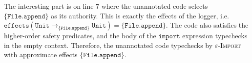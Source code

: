 \documentclass[sigplan,10pt,review]{acmart}\settopmatter{printfolios=true,printccs=false,printacmref=false}
\newcommand{\Unit}{\kwa{Unit}}
\newcommand{\File}{\kwa{File}}
\newcommand{\kwa}[1]{\mathtt{#1}}
\newcommand{\fx}[1]{\kwa{effects}(#1)}
\begin{document}
The interesting part  is on line $7$ where the unannotated code selects $\{ \kwa{File.append} \}$ as its authority. This is exactly the effects of the logger, i.e. $\kwa{effects}(\Unit \rightarrow_{\{\kwa{File.append}\}} \Unit) = \{ \kwa{File.append} \}$. The code also satisfies the higher-order safety predicates, and the body of the $\kwa{import}$ expression typechecks in the empty context. Therefore, the unannotated code typechecks by \textsc{$\varepsilon$-Import} with approximate effects $\kwa{\{ \kwa{File.append} \}}$.

%
%
%
%
%
%
%
%
%
%
\end{document}
